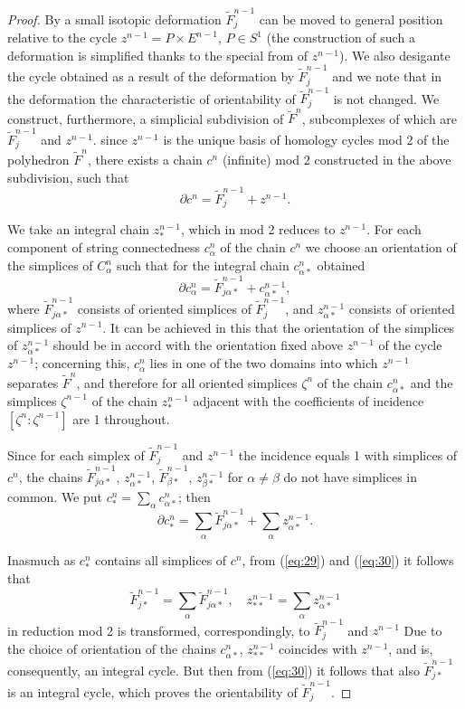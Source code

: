 \documentclass{amsart}
\theoremstyle{plain}
\theoremstyle{definition}
\begin{document}
\begin{proof}
By a small isotopic deformation $\tilde F^{n-1}_j$ can be
moved to general position relative to the cycle $z^{n-1} =
P \times E^{n-1}$, $P\in S^1$ (the construction of such a
deformation is simplified thanks to the special from of
$z^{n-1}$). We also desigante the cycle obtained as a result
of the deformation by $\tilde F^{n-1}_j$ and we note that
in the deformation the characteristic of orientability of
$\tilde F^{n-1}_j$ is not changed. We construct, furthermore,
a simplicial subdivision of $\tilde F^n$, subcomplexes of
which are $\tilde F^{n-1}_j$ and $z^{n-1}$. since $z^{n-1}$
is the unique basis of homology cycles mod 2 of the
polyhedron $\tilde F^n$, there exists a chain $c^n$ (infinite)
mod 2 constructed in the above subdivision, such that
\begin{equation}\partial c^n = \tilde F^{n-1}_j + z^{n-1}. \label{eq:29}
\end{equation}

We take an integral chain $z^{n-1}_*$, which in mod 2 reduces
to $z^{n-1}$. For each component of string connectedness
$c^n_\alpha$ of the chain $c^n$ we choose an orientation of
the simplices of $C^n_\alpha$ such that for the integral chain $c^n_{\alpha *}$ obtained 
$$\partial c^n_\alpha = \tilde F^{n-1}_{j\alpha *} +
c^{n-1}_{\alpha *}, $$
where $\tilde F^{n-1}_{j\alpha *}$ consists of oriented
simplices of $\tilde F^{n-1}_j$, and $z^{n-1}_{\alpha *}$
consists of oriented simplices of $z^{n-1}$. It can be achieved
in this that the orientation of the simplices of
$z^{n-1}_{\alpha *}$ should be in accord with the orientation
fixed above $z^{n-1}$ of the cycle $z^{n-1}$; concerning this,
$c^n_\alpha$ lies in one of the two domains into which
$z^{n-1}$ separates $\tilde F^n$, and therefore for all oriented
simplices $\zeta^n$ of the chain $c^n_{\alpha *}$ and the
simplices $\zeta^{n-1}$ of the chain $z^{n-1}_*$ adjacent
with the coefficients of incidence $[\zeta^n : \zeta^{n-1}]$
are 1 throughout.

Since for each simplex of $\tilde F^{n-1}_j$ and $z^{n-1}$
the incidence equals 1 with simplices of $c^n$, the chains
$\tilde F^{n-1}_{j\alpha *}$, $z^{n-1}_{\alpha *}$,
$\tilde F^{n-1}_{\beta *}$, $z^{n-1}_{\beta *}$ for
$\alpha \ne \beta$ do not have simplices in common. We put
$c^n_* = \sum_\alpha c^n_{\alpha *}$; then
\begin{equation}\partial c^n_* = \sum_\alpha \tilde F^{n-1}_{j\alpha *} +
\sum_\alpha z^{n-1}_{\alpha *}. \label{eq:30}
\end{equation}

Inasmuch as $c^n_*$ contains all simplices of $c^n$, from
(\ref{eq:29}) and (\ref{eq:30}) it follows that
$$\tilde F^{n-1}_{j*} = \sum_\alpha \tilde F^{n-1}_{j\alpha *},
\quad z^{n-1}_{**} = \sum_\alpha z^{n-1}_{\alpha *}$$
in reduction mod 2 is transformed, correspondingly, to
$\tilde F^{n-1}_j$ and $z^{n-1}$ Due to the choice of
orientation of the chains $c^n_{\alpha *}$, $z^{n-1}_{**}$
coincides with $z^{n-1}$, and is, consequently, an integral
cycle. But then from (\ref{eq:30}) it follows that also
$\tilde F^{n-1}_{j*}$ is an integral cycle, which proves
the orientability of $\tilde F^{n-1}_j$.
\end{proof}
\end{document}
